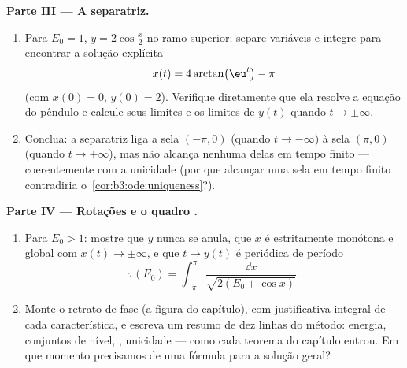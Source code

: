 \begin{problem}
\medskip
\noindent\textbf{Parte III --- A separatriz.}
\begin{enumerate}[resume]
  \item Para $E_0 = 1$, $y = 2\cos\frac x2$ no ramo superior: separe variáveis e integre
        para encontrar a solução explícita
        \[
        x(t) = 4\arctan\bigl(\eu^{t}\bigr) - \pi
        \]
        (com $x(0) = 0$, $y(0) = 2$). Verifique diretamente que ela resolve a
        equação do pêndulo e calcule seus limites e os limites de
        $y(t)$ quando $t \to
        \pm\infty$.
  \item Conclua: a  separatriz liga a sela $(-\pi, 0)$ (quando $t \to -\infty$) à
        sela $(\pi, 0)$ (quando $t \to +\infty$), mas não alcança nenhuma delas em tempo
        finito --- coerentemente com a unicidade (por que alcançar uma
        sela em tempo finito contradiria o~\cref{cor:b3:ode:uniqueness}?).
\end{enumerate}

\medskip
\noindent\textbf{Parte IV --- Rotações e o quadro .}
\begin{enumerate}[resume]
  \item Para $E_0 > 1$: mostre que $y$ nunca se anula, que $x$ é
        estritamente monótona e global com $x(t) \to
        \pm\infty$, e que $t \mapsto y(t)$ é periódica
        de período
        \[
        \tau(E_0) = \int_{-\pi}^{\pi}
        \frac{\dd x}{\sqrt{2(E_0 + \cos x)}} .
        \]
  \item Monte o retrato de fase  (a figura do capítulo), com
        justificativa integral de cada característica, e escreva um
        resumo de dez linhas do método: energia, conjuntos de nível,
        , unicidade --- como cada teorema do capítulo
        entrou. Em que momento precisamos de uma fórmula para a solução
        geral?
\end{enumerate}


\end{problem}
